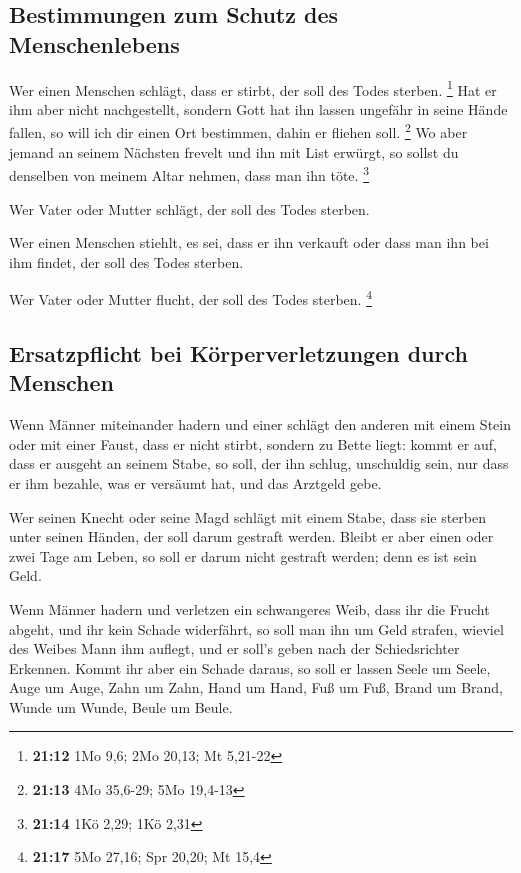 \hypertarget{bestimmungen-zum-schutz-des-menschenlebens}{%
\subsection{Bestimmungen zum Schutz des
Menschenlebens}\label{bestimmungen-zum-schutz-des-menschenlebens}}

 Wer einen Menschen schlägt, dass er stirbt, der soll des
Todes sterben. \footnote{\textbf{21:12} 1Mo 9,6; 2Mo 20,13; Mt 5,21-22}
 Hat er ihm aber nicht nachgestellt, sondern Gott hat ihn
lassen ungefähr in seine Hände fallen, so will ich dir einen Ort
bestimmen, dahin er fliehen soll. \footnote{\textbf{21:13} 4Mo 35,6-29;
  5Mo 19,4-13}  Wo aber jemand an seinem Nächsten frevelt
und ihn mit List erwürgt, so sollst du denselben von meinem Altar
nehmen, dass man ihn töte. \footnote{\textbf{21:14} 1Kö 2,29; 1Kö 2,31}

 Wer Vater oder Mutter schlägt, der soll des Todes
sterben.

 Wer einen Menschen stiehlt, es sei, dass er ihn verkauft
oder dass man ihn bei ihm findet, der soll des Todes sterben.

 Wer Vater oder Mutter flucht, der soll des Todes
sterben. \footnote{\textbf{21:17} 5Mo 27,16; Spr 20,20; Mt 15,4}

\hypertarget{ersatzpflicht-bei-kuxf6rperverletzungen-durch-menschen}{%
\subsection{Ersatzpflicht bei Körperverletzungen durch
Menschen}\label{ersatzpflicht-bei-kuxf6rperverletzungen-durch-menschen}}

 Wenn Männer miteinander hadern und einer schlägt den
anderen mit einem Stein oder mit einer Faust, dass er nicht stirbt,
sondern zu Bette liegt:  kommt er auf, dass er ausgeht an
seinem Stabe, so soll, der ihn schlug, unschuldig sein, nur dass er ihm
bezahle, was er versäumt hat, und das Arztgeld gebe.

 Wer seinen Knecht oder seine Magd schlägt mit einem
Stabe, dass sie sterben unter seinen Händen, der soll darum gestraft
werden.  Bleibt er aber einen oder zwei Tage am Leben, so
soll er darum nicht gestraft werden; denn es ist sein Geld.

 Wenn Männer hadern und verletzen ein schwangeres Weib,
dass ihr die Frucht abgeht, und ihr kein Schade widerfährt, so soll man
ihn um Geld strafen, wieviel des Weibes Mann ihm auflegt, und er soll's
geben nach der Schiedsrichter Erkennen.  Kommt ihr aber
ein Schade daraus, so soll er lassen Seele um Seele, 
Auge um Auge, Zahn um Zahn, Hand um Hand, Fuß um Fuß, 
Brand um Brand, Wunde um Wunde, Beule um Beule.

